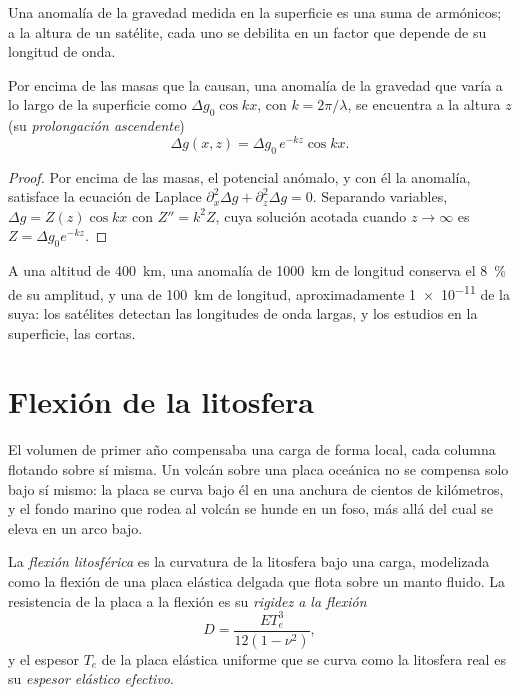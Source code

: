 Una anomalía de la gravedad medida en la superficie es una suma de armónicos; a la
altura de un satélite, cada uno se debilita en un factor que depende de su
longitud de onda.

\begin{proposition}\label{prop:b3:gravity-geodesy:upward}
Por encima de las masas que la causan, una anomalía de la gravedad que varía a lo largo de la superficie
como $\Delta g_0\cos kx$, con $k = 2\pi/\lambda$, se encuentra a la altura $z$ (su
\emph{prolongación ascendente})
\[
  \Delta g(x, z) = \Delta g_0\,e^{-kz}\cos kx .
\]
\end{proposition}

\begin{proof}
Por encima de las masas, el potencial anómalo, y con él la anomalía, satisface la
ecuación de Laplace $\partial_x^2\Delta g + \partial_z^2\Delta g = 0$. Separando
variables, $\Delta g = Z(z)\cos kx$ con $Z'' = k^2Z$, cuya solución acotada cuando
$z \to \infty$ es $Z = \Delta g_0e^{-kz}$.
\end{proof}

A una altitud de \qty{400}{km}, una anomalía de \qty{1000}{km} de longitud conserva el \qty{8}{\percent}
de su amplitud, y una de \qty{100}{km} de longitud, aproximadamente \num{1e-11} de la suya:
los satélites detectan las longitudes de onda largas, y los estudios en la superficie, las cortas.

\section{Flexión de la litosfera}

El volumen de primer año compensaba una carga de forma local, cada columna flotando sobre sí misma.
Un volcán sobre una placa oceánica no se compensa solo bajo sí mismo: la placa se curva bajo él
en una anchura de cientos de kilómetros, y el fondo marino
que rodea al volcán se hunde en un foso, más allá del cual se eleva en un arco bajo.

\begin{definition}\label{def:b3:gravity-geodesy:flexure}
La \emph{flexión litosférica} es la curvatura de la
litosfera bajo una carga, modelizada como la flexión de una placa elástica delgada
que flota sobre un manto fluido. La resistencia de la placa a la flexión es su
\emph{rigidez a la flexión}
\[
  D = \frac{ET_e^3}{12(1 - \nu^2)},
\]
y el espesor $T_e$ de la placa elástica uniforme que se curva como la litosfera real es su
\emph{espesor elástico efectivo}.
\end{definition}

